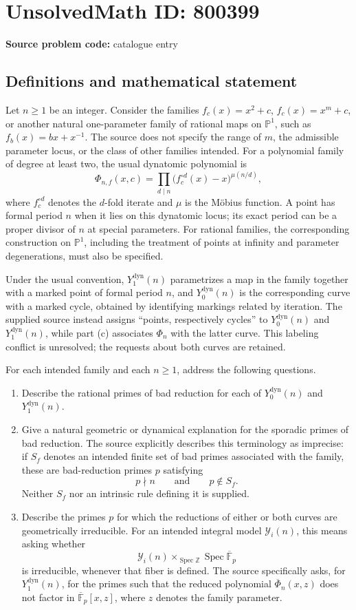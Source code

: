 \documentclass[11pt]{article}
\newcommand{\Z}{\mathbb{Z}}
\newcommand{\F}{\mathbb{F}}
\newcommand{\PP}{\mathbb{P}}
\begin{document}
\section*{UnsolvedMath ID: 800399}
\textbf{Source problem code:} catalogue entry
\subsection{Definitions and mathematical statement}
Let \(n\geq 1\) be an integer. Consider the families \(f_c(x)=x^2+c\), \(f_c(x)=x^m+c\), or another natural one-parameter family of rational maps on \(\PP^1\), such as \(f_b(x)=bx+x^{-1}\). The source does not specify the range of \(m\), the admissible parameter locus, or the class of other families intended. For a polynomial family of degree at least two, the usual dynatomic polynomial is
\[
\Phi_{n,f}(x,c)=\prod_{d\mid n}\bigl(f_c^{\circ d}(x)-x\bigr)^{\mu(n/d)},
\]
where \(f_c^{\circ d}\) denotes the \(d\)-fold iterate and \(\mu\) is the M\"obius function. A point has formal period \(n\) when it lies on this dynatomic locus; its exact period can be a proper divisor of \(n\) at special parameters. For rational families, the corresponding construction on \(\PP^1\), including the treatment of points at infinity and parameter degenerations, must also be specified.

Under the usual convention, \(Y_1^{\mathrm{dyn}}(n)\) parametrizes a map in the family together with a marked point of formal period \(n\), and \(Y_0^{\mathrm{dyn}}(n)\) is the corresponding curve with a marked cycle, obtained by identifying markings related by iteration. The supplied source instead assigns ``points, respectively cycles'' to \(Y_0^{\mathrm{dyn}}(n)\) and \(Y_1^{\mathrm{dyn}}(n)\), while part (c) associates \(\Phi_n\) with the latter curve. This labeling conflict is unresolved; the requests about both curves are retained.

For each intended family and each \(n\geq1\), address the following questions.
\begin{enumerate}
\item[(a)] Describe the rational primes of bad reduction for each of \(Y_0^{\mathrm{dyn}}(n)\) and \(Y_1^{\mathrm{dyn}}(n)\).
\item[(b)] Give a natural geometric or dynamical explanation for the sporadic primes of bad reduction. The source explicitly describes this terminology as imprecise: if \(S_f\) denotes an intended finite set of bad primes associated with the family, these are bad-reduction primes \(p\) satisfying
\[
p\nmid n\qquad\text{and}\qquad p\notin S_f.
\]
Neither \(S_f\) nor an intrinsic rule defining it is supplied.
\item[(c)] Describe the primes \(p\) for which the reductions of either or both curves are geometrically irreducible. For an intended integral model \(\mathcal Y_i(n)\), this means asking whether
\[
\mathcal Y_i(n)\times_{\operatorname{Spec}\Z}
\operatorname{Spec}\overline{\F}_p
\]
is irreducible, whenever that fiber is defined. The source specifically asks, for \(Y_1^{\mathrm{dyn}}(n)\), for the primes such that the reduced polynomial \(\overline{\Phi}_n(x,z)\) does not factor in \(\overline{\F}_p[x,z]\), where \(z\) denotes the family parameter.
\end{enumerate}
\end{document}
